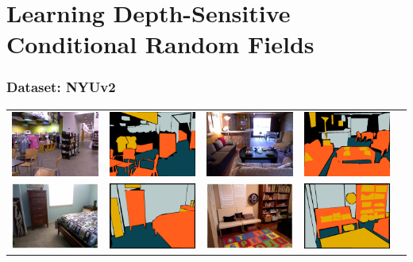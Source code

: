 \documentclass[final,ignorenonframetext,compress]{beamer}
\begin{document}
\section{Learning Depth-Sensitive Conditional Random Fields}

\begin{frame}
    \frametitle{Dataset: NYUv2}
    \begin{tabularx}{\linewidth}{@{\extracolsep{\fill}}ccccc}

        \includegraphics[width=.22\textwidth]{images/00118_image.png}&%
        \includegraphics[width=.22\linewidth]{images/00118_gt.png}&
        \includegraphics[width=.22\textwidth]{images/01203_image.png}&%
        \includegraphics[width=.22\linewidth]{images/01203_gt.png}\\

        \includegraphics[width=.22\textwidth]{images/01147_image.png}&%
        \includegraphics[width=.22\linewidth]{images/01147_gt.png}&
        \includegraphics[width=.22\textwidth]{images/00281_image.png}&%
        \includegraphics[width=.22\linewidth]{images/00281_gt.png}\\


\end{tabularx}
\end{frame}
\end{document}
